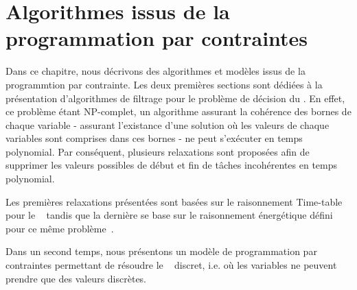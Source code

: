 \chapter{Algorithmes issus de la programmation par contraintes}

Dans ce chapitre, nous décrivons des algorithmes et modèles issus de
la programmtion par contrainte. Les deux premières sections sont
dédiées à la présentation d'algorithmes de filtrage pour le problème
de décision du \CECSP. En effet, ce problème étant NP-complet, un
algorithme assurant la cohérence des bornes de chaque variable -
assurant l'existance d'une solution où les valeurs de chaque 
variables sont comprises dans ces bornes - ne peut s'exécuter en temps
polynomial. Par conséquent, plusieurs relaxations sont proposées afin
de supprimer les valeurs possibles de début et fin de tâches
incohérentes en temps polynomial. 

Les premières relaxations présentées sont basées sur le raisonnement
Time-table pour le \CUSP~\cite{TTLah} tandis que la dernière se base
sur le raisonnement énergétique défini pour ce même
problème~\cite{RELopez}.

Dans un second temps, nous présentons un modèle de programmation par
contraintes permettant de résoudre le \CECSP~ discret, i.e. où les
variables ne peuvent prendre que des valeurs discrètes. 





